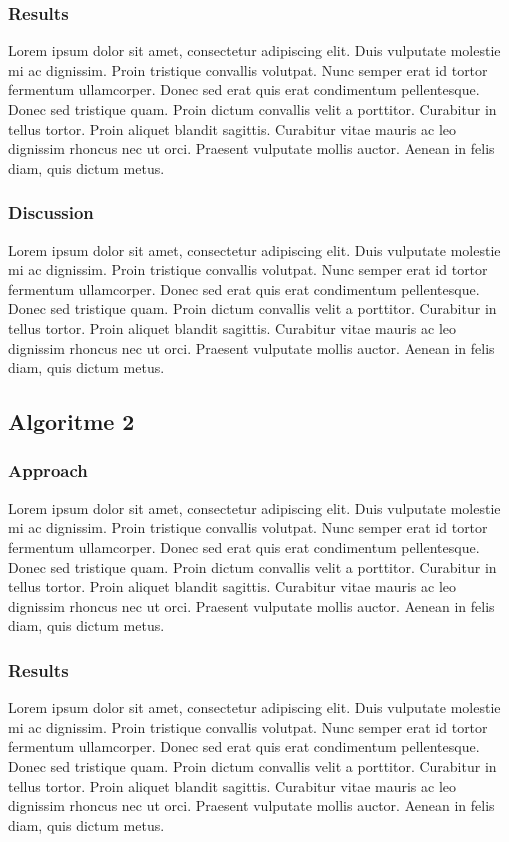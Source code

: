 \documentclass[11pt]{article}
\begin{document}
\subsubsection{Results}
Lorem ipsum dolor sit amet, consectetur adipiscing elit. Duis vulputate molestie mi ac dignissim. Proin tristique convallis volutpat. Nunc semper erat id tortor fermentum ullamcorper. Donec sed erat quis erat condimentum pellentesque. Donec sed tristique quam. Proin dictum convallis velit a porttitor. Curabitur in tellus tortor. Proin aliquet blandit sagittis. Curabitur vitae mauris ac leo dignissim rhoncus nec ut orci. Praesent vulputate mollis auctor. Aenean in felis diam, quis dictum metus.

\subsubsection{Discussion}
Lorem ipsum dolor sit amet, consectetur adipiscing elit. Duis vulputate molestie mi ac dignissim. Proin tristique convallis volutpat. Nunc semper erat id tortor fermentum ullamcorper. Donec sed erat quis erat condimentum pellentesque. Donec sed tristique quam. Proin dictum convallis velit a porttitor. Curabitur in tellus tortor. Proin aliquet blandit sagittis. Curabitur vitae mauris ac leo dignissim rhoncus nec ut orci. Praesent vulputate mollis auctor. Aenean in felis diam, quis dictum metus.

\subsection{Algoritme 2}
\subsubsection{Approach}
Lorem ipsum dolor sit amet, consectetur adipiscing elit. Duis vulputate molestie mi ac dignissim. Proin tristique convallis volutpat. Nunc semper erat id tortor fermentum ullamcorper. Donec sed erat quis erat condimentum pellentesque. Donec sed tristique quam. Proin dictum convallis velit a porttitor. Curabitur in tellus tortor. Proin aliquet blandit sagittis. Curabitur vitae mauris ac leo dignissim rhoncus nec ut orci. Praesent vulputate mollis auctor. Aenean in felis diam, quis dictum metus.

\subsubsection{Results}
Lorem ipsum dolor sit amet, consectetur adipiscing elit. Duis vulputate molestie mi ac dignissim. Proin tristique convallis volutpat. Nunc semper erat id tortor fermentum ullamcorper. Donec sed erat quis erat condimentum pellentesque. Donec sed tristique quam. Proin dictum convallis velit a porttitor. Curabitur in tellus tortor. Proin aliquet blandit sagittis. Curabitur vitae mauris ac leo dignissim rhoncus nec ut orci. Praesent vulputate mollis auctor. Aenean in felis diam, quis dictum metus.
\end{document}
